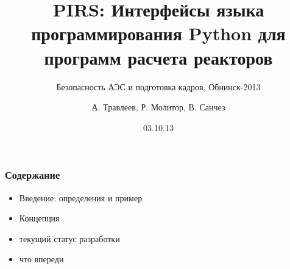 \documentclass[t]{beamer}
\date{03.10.13}
\title[Python-интерфейсы для программ расчета реакторов]{PIRS: Интерфейсы языка программирования Python для программ расчета реакторов}
\subtitle{Безопасность АЭС и подготовка кадров, Обнинск-2013}
\author{А. Травлеев, Р. Молитор, В. Санчез}
\institute{Institute for Neutron Physics and Reactor Technology}
\begin{document}
\begin{frame}
  \maketitle
\end{frame}

\begin{frame}\frametitle{Содержание}

    \begin{itemize}
        \item Введение: определения и пример

        \item Концепция

        \item текущий статус разработки

        \item что впереди

    \end{itemize}
\end{frame}
\end{document}
